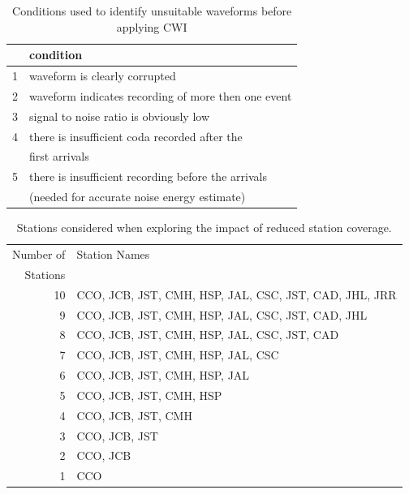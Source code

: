 \documentclass[extra, onecolumn, doublespacing]{gji}
\begin{document}
\begin{table}
\caption[Conditions for identifying unsuitable waveforms when
applying CWI] {Conditions used to identify unsuitable waveforms
before applying CWI \citep[Originally published as Table
5][]{dr_Robinson11a}} \label{tab:-conditions4unsuitablewaveform}
\begin{tabular}{|l|p{}|}
\hline
 & \textbf{condition} \\
\hline
1 & waveform is clearly corrupted \\
2 & waveform indicates recording of more then one event \\
3 & signal to noise ratio is obviously low \\
4 & there is insufficient coda recorded after the \\
 & first arrivals \\
5 & there is insufficient recording before the arrivals \\
 &  (needed for accurate noise energy estimate) \\
\hline
\end{tabular}
\end{table}


\begin{table}
\caption{Stations considered when exploring the impact of reduced
station coverage.} \label{tab:Calaveras-stationremoval}
\begin{tabular}{|r|l|}
\hline
Number of & Station Names\\
Stations  & \\
\hline
10 & CCO, JCB, JST, CMH, HSP, JAL, CSC, JST, CAD, JHL, JRR\\
9  & CCO, JCB, JST, CMH, HSP, JAL, CSC, JST, CAD, JHL\\
8  & CCO, JCB, JST, CMH, HSP, JAL, CSC, JST, CAD\\
7  & CCO, JCB, JST, CMH, HSP, JAL, CSC \\
6  & CCO, JCB, JST, CMH, HSP, JAL \\
5  & CCO, JCB, JST, CMH, HSP \\
4  & CCO, JCB, JST, CMH \\
3  & CCO, JCB, JST \\
2  & CCO, JCB \\
1  & CCO \\
\hline
\end{tabular}
\end{table}
\end{document}
